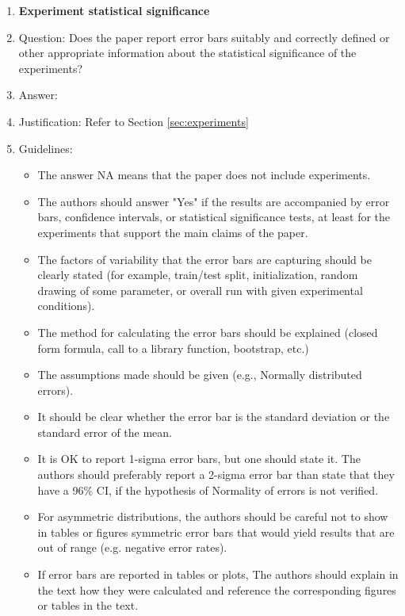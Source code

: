 \documentclass{article}
\begin{document}
\begin{enumerate}
\item {\bf Experiment statistical significance}
    \item[] Question: Does the paper report error bars suitably and correctly defined or other appropriate information about the statistical significance of the experiments?
    \item[] Answer: \answerYes{} %
    \item[] Justification: Refer to Section \ref{sec:experiments}
    \item[] Guidelines:
    \begin{itemize}
        \item The answer NA means that the paper does not include experiments.
        \item The authors should answer "Yes" if the results are accompanied by error bars, confidence intervals, or statistical significance tests, at least for the experiments that support the main claims of the paper.
        \item The factors of variability that the error bars are capturing should be clearly stated (for example, train/test split, initialization, random drawing of some parameter, or overall run with given experimental conditions).
        \item The method for calculating the error bars should be explained (closed form formula, call to a library function, bootstrap, etc.)
        \item The assumptions made should be given (e.g., Normally distributed errors).
        \item It should be clear whether the error bar is the standard deviation or the standard error of the mean.
        \item It is OK to report 1-sigma error bars, but one should state it. The authors should preferably report a 2-sigma error bar than state that they have a 96\% CI, if the hypothesis of Normality of errors is not verified.
        \item For asymmetric distributions, the authors should be careful not to show in tables or figures symmetric error bars that would yield results that are out of range (e.g. negative error rates).
        \item If error bars are reported in tables or plots, The authors should explain in the text how they were calculated and reference the corresponding figures or tables in the text.
    \end{itemize}


\end{enumerate}
\end{document}
